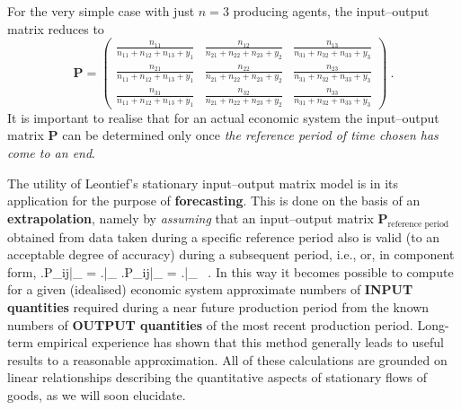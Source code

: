 \medskip
\noindent
For the very simple case with just $n=3$ producing agents, the 
input--output matrix reduces to
%
\[
\displaystyle
\mathbf{P} =
\left(\begin{array}{ccc}
\frac{n_{11}}{n_{11}+n_{12}+n_{13}+y_{1}} &
\frac{n_{12}}{n_{21}+n_{22}+n_{23}+y_{2}} &
\frac{n_{13}}{n_{31}+n_{32}+n_{33}+y_{3}} \\
\frac{n_{21}}{n_{11}+n_{12}+n_{13}+y_{1}} &
\frac{n_{22}}{n_{21}+n_{22}+n_{23}+y_{2}} &
\frac{n_{23}}{n_{31}+n_{32}+n_{33}+y_{3}} \\
\frac{n_{31}}{n_{11}+n_{12}+n_{13}+y_{1}} &
\frac{n_{32}}{n_{21}+n_{22}+n_{23}+y_{2}} &
\frac{n_{33}}{n_{31}+n_{32}+n_{33}+y_{3}}
\end{array}\right) \ .
\]
%
It is important to realise that for an actual economic system the 
input--output matrix $\mathbf{P}$ can be determined only once 
\emph{the reference period of time chosen has come to an end}.

\medskip
\noindent
The utility of Leontief's stationary input--output matrix model is 
in its application for the purpose of {\bf forecasting}. This is 
done on the basis of an {\bf extrapolation}, namely by 
\emph{assuming} that an input--output matrix 
$\mathbf{P}_{\text{reference\ period}}$ obtained from data taken 
during a specific reference period also is valid (to an 
acceptable degree of accuracy) during a subsequent period, i.e.,
%
\be
{}
\ee
%
or, in component form,
%
\be
\left.P_{ij}\right|_{}
= \left.\right|_{}
\approx
\left.P_{ij}\right|_{}
= \left.\right|_{} \ .
\ee
%
In this way it becomes possible to compute for a given (idealised) 
economic system approximate numbers of {\bf INPUT quantities} 
required during a near future production period from the known 
numbers of {\bf OUTPUT quantities} of the most recent production 
period. Long-term empirical experience has shown that this method 
generally leads to useful results to a reasonable approximation. 
All of these  calculations are grounded on linear relationships 
describing the quantitative aspects of stationary flows of goods, 
as we will soon elucidate.

